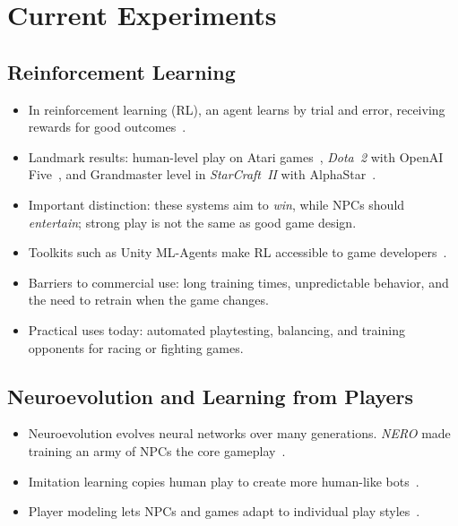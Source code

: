 \section{Current Experiments}
\label{sec:experiments}

\subsection{Reinforcement Learning}
\begin{itemize}
  \item In reinforcement learning (RL), an agent learns by trial and error,
        receiving rewards for good outcomes~\cite{sutton2018}.
  \item Landmark results: human-level play on Atari games~\cite{mnih2015},
        \emph{Dota~2} with OpenAI Five~\cite{berner2019}, and Grandmaster
        level in \emph{StarCraft~II} with AlphaStar~\cite{vinyals2019}.
  \item Important distinction: these systems aim to \emph{win}, while NPCs
        should \emph{entertain}; strong play is not the same as good game
        design.
  \item Toolkits such as Unity ML-Agents make RL accessible to game
        developers~\cite{juliani2018}.
  \item Barriers to commercial use: long training times, unpredictable
        behavior, and the need to retrain when the game changes.
  \item Practical uses today: automated playtesting, balancing, and
        training opponents for racing or fighting games.
\end{itemize}

\subsection{Neuroevolution and Learning from Players}
\begin{itemize}
  \item Neuroevolution evolves neural networks over many generations.
        \emph{NERO} made training an army of NPCs the core
        gameplay~\cite{stanley2005}.
  \item Imitation learning copies human play to create more human-like
        bots~\cite{yannakakis2018}.
  \item Player modeling lets NPCs and games adapt to individual play
        styles~\cite{yannakakis2018}.
\end{itemize}

